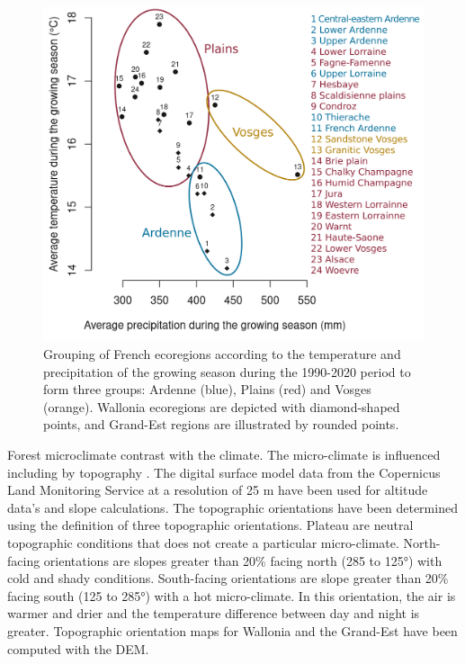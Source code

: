 \documentclass[3p,procedia]{elsarticle}
\begin{document}
\begin{figure}[htbp] 
	\centering
	\includegraphics[width=0.8\linewidth]{climat/climat_region.png}
	\caption{Grouping of French ecoregions according to the temperature and precipitation of the growing season during the 1990-2020 period to form three groups: Ardenne (blue), Plains (red) and Vosges (orange). Wallonia ecoregions are depicted with diamond-shaped points, and Grand-Est regions are illustrated by rounded points.}
	\label{fig:clim}
\end{figure}

Forest microclimate contrast with the climate.
The micro-climate is influenced including by topography \citep{de_frenne_forest_2021}.
The digital surface model data from the Copernicus Land Monitoring Service \citep{DEM_copernicus} at a resolution of 25 m have been used for altitude data's and slope calculations.
The topographic orientations have been determined using the \cite{Delvaux_galoux} definition of three topographic orientations.
Plateau are neutral topographic conditions that does not create a particular micro-climate. 
North-facing orientations are slopes greater than  20\% facing north (285 to 125°) with cold and shady conditions.
South-facing orientations are slope greater than  20\% facing south (125 to 285°) with a hot micro-climate.
In this orientation, the air is warmer and drier and the temperature difference between day and night is greater.
Topographic orientation maps for Wallonia and the Grand-Est have been computed with the DEM. 
\end{document}
